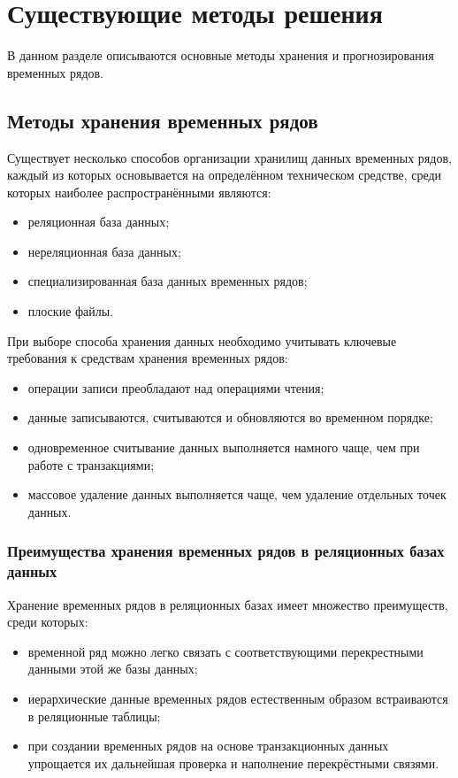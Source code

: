 \chapter{Существующие методы решения}

В данном разделе описываются основные методы хранения и прогнозирования временных рядов.

\section{Методы хранения временных рядов}

Существует несколько способов организации хранилищ данных временных рядов, каждый из которых
основывается на определённом техническом средстве, среди которых наиболее распространёнными являются:

\begin{itemize}[label=—]
	\item реляционная база данных;
	\item нереляционная база данных;
	\item специализированная база данных временных рядов;
	\item плоские файлы.
\end{itemize}

При выборе способа хранения данных необходимо учитывать ключевые требования к средствам хранения 
временных рядов:

\begin{itemize}[label=—]
	\item операции записи преобладают над операциями чтения;
	\item данные записываются, считываются и обновляются во временном порядке;
	\item одновременное считывание данных выполняется намного чаще, чем при работе с транзакциями;
	\item массовое удаление данных выполняется чаще, чем удаление отдельных точек данных.
\end{itemize}

\subsection{Преимущества хранения временных рядов в реляционных базах данных}

Хранение временных рядов в реляционных базах имеет множество преимуществ, среди которых:

\begin{itemize}[label=—]
	\item временной ряд можно легко связать с соответствующими перекрестными данными этой же базы данных;
	\item иерархические данные временных рядов естественным образом встраиваются в реляционные таблицы;
	\item при создании временных рядов на основе транзакционных данных упрощается их дальнейшая проверка
	и наполнение перекрёстными связями.
\end{itemize}

